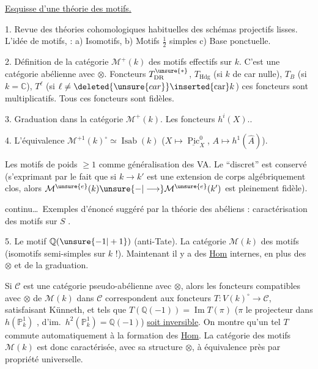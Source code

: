 \uline{Esquisse d'une théorie des motifs.}

1. Revue des théories cohomologiques habituelles des schémas projectifs lisses.
L'idée de motifs, 
 : a) Isomotifs, b) Motifs $\frac12$ simples c) Base ponctuelle.
\margin{*}

2. Définition de la catégorie $\mathcal{M}^+(k)$ des motifs effectifs sur $k$.
C'est une catégorie abélienne  avec $\otimes$.
Foncteurs $T^{\unsure{*}}_{\mathrm{DR}}$, $T_{\mathrm{Hdg}}$ (si $k$ de car nulle), $T_B$ (si $k=\mathbb{C}$), $T^\ell$ (si $\ell\ne\deleted{\unsure{car}}\inserted{\operatorname{car}}k$)  ces foncteurs sont multiplicatifs. Tous ces foncteurs sont fidèles.

3. Graduation dans la catégorie $\mathcal{M}^+(k)$. Les foncteurs $h^i(X)$..

4. L'équivalence $\mathcal{M}^{+1}(k)^\circ\simeq\operatorname{Isab}(k)$
($X\mapsto\underline{\operatorname{Pic}}^0_X$, $A\mapsto h^1(\widehat A)$).

\margin{*}
Les motifs de poids $\geq1$ comme généralisation des VA. Le  ``discret'' est conservé (s'exprimant  par le fait que si $k\longrightarrow k'$ est une extension de corps algébriquement clos, alors $\mathcal{M}^{\unsure{e}}(k)\unsure{-|\longrightarrow}\mathcal{M}^{\unsure{e}}(k')$ est pleinement fidèle).

 continu\dots\ Exemples d'énoncé suggéré par la théorie des  abéliens : caractérisation des motifs  sur $S$ .
\margin{*}

5. Le motif $\mathbb{Q}(\unsure{-1|+1})$ (anti-Tate). La catégorie $\mathcal{M}(k)$ des motifs (isomotifs semi-simples sur $k$ !). Maintenant il y a des \uline{Hom} internes, en plus des $\otimes$ et de la graduation.

Si $\mathcal C$ est une catégorie pseudo-abélienne avec $\otimes$, alors les foncteurs compatibles avec $\otimes$ de $\mathcal{M}(k)$ dans $\mathcal C$ correspondent aux foncteurs $T:V(k)^\circ\longrightarrow\mathcal C$, satisfaisant Künneth, et tels que  $T(\mathbb{Q}(-1))=\operatorname{Im}T(\pi)$
($\pi$ le projecteur dans $h(\mathbb{P}^1_k)$ , d'im.\ $h^2(\mathbb{P}^1_k)=\mathbb{Q}(-1)$)
\uline{soit inversible}. On montre qu'un tel $T$ commute automatiquement à la formation des \uline{Hom}. La catégorie des motifs $\mathcal{M}(k)$ est donc caractérisée, avec sa structure $\otimes$,  à équivalence près par propriété universelle.

